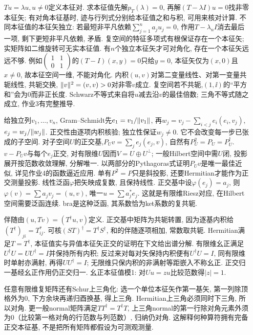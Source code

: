 $Tu=\lambda u,u\ne0$定义本征对. 求本征值先解$p_T(\lambda)=0$, 再解$(T-\lambda I)u=0$找非零本征矢; 有对角本征基时, 迹与行列式分别给本征值之和与积, 可用来核对计算. 不同本征值的本征矢独立: 若最短非平凡依赖$\sum_{j=1}^na_ju_j=0$, 作用$T-\lambda_nI$消去最后一项, 剩下更短非平凡依赖, 矛盾. 复空间的特征多项式有根保证存在一个本征矢; 实矩阵如二维旋转可无实本征值. 有$n$个独立本征矢才可对角化, 存在一个本征矢远远不够. 例如$\begin{pmatrix}1&1\\0&1\end{pmatrix}$的$(T-I)(x,y)=0$只给$y=0$, 本征矢仅为$(x,0)$且$x\ne0$, 故本征空间一维, 不能对角化.
内积$(u,v)$对第二变量线性、对第一变量共轭线性, 共轭交换, $\lVert v\rVert^2=(v,v)>0$对非零$v$成立. 复空间若不共轭,$(1,\ii)$的“平方和”会为0而非正长度. Schwarz不等式来自将$u$减去沿$v$的最佳倍数; 三角不等式随之成立, 作业3有完整推导.

给独立列$v_1,\ldots,v_n$, Gram--Schmidt先$e_1=v_1/\lVert v_1\rVert$, 再$w_j=v_j-\sum_{i<j}e_i(e_i,v_j)$, $e_j=w_j/\lVert w_j\rVert$. 正交性由逐项内积核验; 独立性保证$w_j\ne0$. 它不会改变每一步已张成的子空间. 对子空间$U$的正交基,$P_Uv=\sum_je_j(e_j,v)$, 自然有$P_U^2=P_U=P_U^\dagger$. $v-P_Uv$与每个$e_j$正交, 对有限维$U$因而$V=U\oplus U^\perp$; 一般Hilbert空间中需$U$闭, 投影展开按范数收敛理解, 分解唯一. 以两部分的Pythagoras式证明$P_Uv$是唯一最佳近似, 详见作业4的函数逼近应用. 单有$P^2=P$只是斜投影, 还要Hermitian才能作为正交测量投影.
线性泛函$\varphi$把矢映成复数, 且保持线性. 正交基中设$\varphi(e_j)=a_j$, 则$\varphi(v)=\sum a_jv_j=(u,v)$, 唯一$u=\sum a_j^*e_j$. 这就是有限维Riesz对应, 在Hilbert空间需要泛函连续. bra是这种泛函, 其系数恰为ket系数的复共轭.

伴随由$(u,Tv)=(T^\dagger u,v)$定义. 正交基中矩阵为共轭转置, 因为逐基内积给$(T^\dagger)_{ji}=T_{ij}^*$. 可核$(ST)^\dagger=T^\dagger S^\dagger$, 和的伴随逐项相加, 常数取共轭. Hermitian满足$T=T^\dagger$, 本征值实与异值本征矢正交的证明在下文给出谱分解. 有限维幺正满足$U^\dagger U=UU^\dagger=I$并保持所有内积; 反过来对每对矢保持内积便有$U^\dagger U=I$, 同有限维时单射亦满射, 再得$UU^\dagger=I$; 无限维只保内积的非满射等距嵌入不称幺正. 正交归一基经幺正作用仍正交归一. 幺正本征值模1: 对$Uu=zu$比较范数得$|z|=1$.

任意有限维复矩阵还有Schur上三角化: 选一个单位本征矢作第一基矢, 第一列除顶格外为0, 下方余块再递归酉换基, 得上三角. Hermitian上三角必须同时下三角, 所以对角. 更一般normal矩阵满足$TT^\dagger=T^\dagger T$, 上三角normal的第一行除对角元素外须为0（比较第一格对角的行范数与列范数）, 归纳仍对角. 这解释何种算符拥有完备正交本征基, 不是把所有矩阵都假设为可测观测量.

